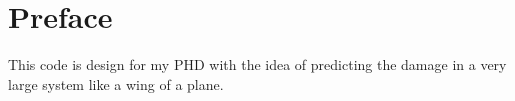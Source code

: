 \chapter*{Preface}

\par
This code is design for my PHD with the idea of predicting the damage in a very large system like a wing of a plane.
